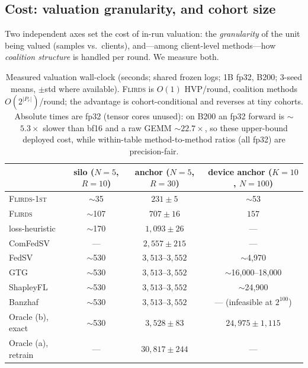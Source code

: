 \subsection{Cost: valuation granularity, and cohort size}
\label{sec:results-cost}

Two independent axes set the cost of in-run valuation: the \emph{granularity}
of the unit being valued (samples vs.\ clients), and---among client-level
methods---how \emph{coalition structure} is handled per round. We measure both.

\begin{table}[t]
\centering
\caption{Measured valuation wall-clock (seconds; shared frozen logs; 1B fp32,
B200; 3-seed means, $\pm$std where available). \textsc{Flirds} is $O(1)$
HVP/round, coalition methods $O(2^{|P_r|})$/round; the advantage is
cohort-conditional and reverses at tiny cohorts. Absolute times are fp32
(tensor cores unused): on B200 an fp32 forward is $\sim$$5.3\times$ slower than
bf16 and a raw GEMM $\sim$$22.7\times$, so these upper-bound deployed cost,
while within-table method-to-method ratios (all fp32) are precision-fair.
\protect{}}
\label{tab:cost}
\small
\begin{tabular}{lccc}
\toprule
 & silo ($N{=}5$, $R{=}10$) & anchor ($N{=}5$, $R{=}30$) & device anchor ($K{=}10$, $N{=}100$) \\
\midrule
\textsc{Flirds-1st}   & $\sim$35    & $231\pm5$    & $\sim$53 \\
\textsc{Flirds}       & $\sim$107   & $707\pm16$   & $157$ \\
loss-heuristic        & $\sim$170   & $1{,}093\pm26$ & --- \\
ComFedSV              & ---   & $2{,}557\pm215$ & --- \\
FedSV                 & $\sim$530   & $3{,}513$--$3{,}552$ & $\sim$4{,}970 \\
GTG                   & $\sim$530   & $3{,}513$--$3{,}552$ & $\sim$16{,}000--18{,}000 \\
ShapleyFL             & $\sim$530   & $3{,}513$--$3{,}552$ & $\sim$24{,}900 \\
Banzhaf               & $\sim$530   & $3{,}513$--$3{,}552$ & --- (infeasible at $2^{100}$) \\
Oracle (b), exact     & $\sim$530   & $3{,}528\pm83$ & $24{,}975\pm1{,}115$ \\
Oracle (a), retrain   & ---   & $30{,}817\pm244$ & --- \\
\bottomrule
\end{tabular}
\end{table}

